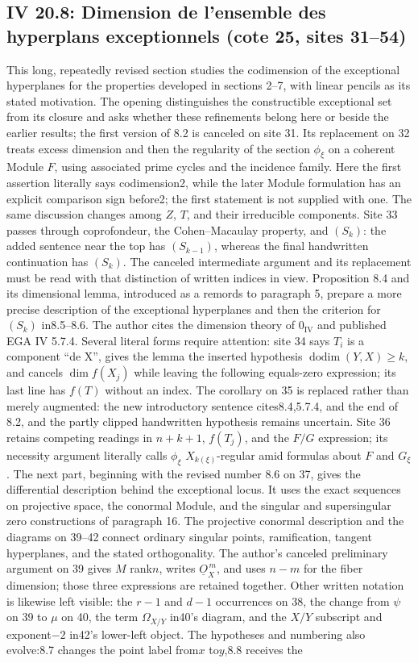 \documentclass[10pt,a4paper]{article}
\begin{document}
\subsection*{IV 20.8: Dimension de l'ensemble des hyperplans exceptionnels (cote 25, sites 31--54)}
This long, repeatedly revised section studies the codimension of the exceptional hyperplanes for the properties developed in sections 2--7, with linear pencils as its stated motivation. The opening distinguishes the constructible exceptional set from its closure and asks whether these refinements belong here or beside the earlier results; the first version of 8.2 is canceled on site 31. Its replacement on 32 treats excess dimension and then the regularity of the section $\phi_\xi$ on a coherent Module $F$, using associated prime cycles and the incidence family. Here the first assertion literally says codimension2, while the later Module formulation has an explicit comparison sign before2; the first statement is not supplied with one. The same discussion changes among $Z$, $T$, and their irreducible components. Site 33 passes through coprofondeur, the Cohen--Macaulay property, and $(S_k)$: the added sentence near the top has $(S_{k-1})$, whereas the final handwritten continuation has $(S_k)$. The canceled intermediate argument and its replacement must be read with that distinction of written indices in view. Proposition 8.4 and its dimensional lemma, introduced as a remords to paragraph 5, prepare a more precise description of the exceptional hyperplanes and then the criterion for $(S_k)$ in8.5--8.6. The author cites the dimension theory of $0_{\mathrm{IV}}$ and published EGA IV 5.7.4. Several literal forms require attention: site 34 says $T_i$ is a component ``de X'', gives the lemma the inserted hypothesis $\operatorname{dodim}(Y,X)\geq k$, and cancels $\dim f(X_j)$ while leaving the following equals-zero expression; its last line has $f(T)$ without an index. The corollary on 35 is replaced rather than merely augmented: the new introductory sentence cites8.4,5.7.4, and the end of 8.2, and the partly clipped handwritten hypothesis remains uncertain. Site 36 retains competing readings in $n+k+1$, $f(T_j)$, and the $F/G$ expression; its necessity argument literally calls $\phi_\xi$ $X_{k(\xi)}$-regular amid formulas about $F$ and $G_\xi$. The next part, beginning with the revised number 8.6 on 37, gives the differential description behind the exceptional locus. It uses the exact sequences on projective space, the conormal Module, and the singular and supersingular zero constructions of paragraph 16. The projective conormal description and the diagrams on 39--42 connect ordinary singular points, ramification, tangent hyperplanes, and the stated orthogonality. The author's canceled preliminary argument on 39 gives $M$ rank$n$, writes $\underline{O}_X^{\,m}$, and uses $n-m$ for the fiber dimension; those three expressions are retained together. Other written notation is likewise left visible: the $r-1$ and $d-1$ occurrences on 38, the change from $\psi$ on 39 to $\mu$ on 40, the term $\Omega_{X/Y}$ in40's diagram, and the $X/Y$ subscript and exponent$-2$ in42's lower-left object. The hypotheses and numbering also evolve:8.7 changes the point label from$x$ to$y$,8.8 receives the 
\end{document}

